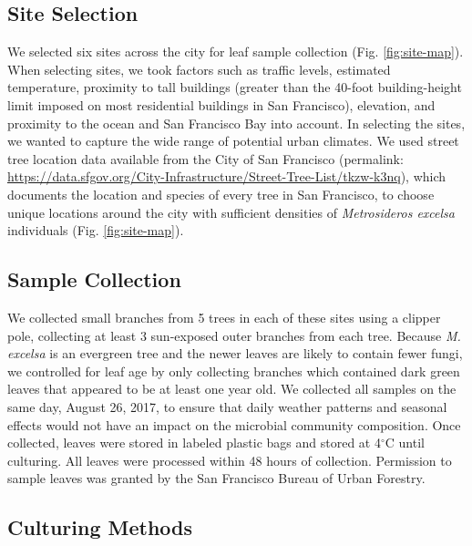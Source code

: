 \documentclass[fleqn,10pt,lineno]{wlpeerj} %
\begin{document}
\hypertarget{site-selection}{%
\subsection*{Site Selection}\label{site-selection}}

We selected six sites across the city for leaf sample collection (Fig. \ref{fig:site-map}). When selecting sites, we took factors such as traffic levels, estimated temperature, proximity to tall buildings (greater than the 40-foot building-height limit imposed on most residential buildings in San Francisco), elevation, and proximity to the ocean and San Francisco Bay into account. In selecting the sites, we wanted to capture the wide range of potential urban climates. We used street tree location data available from the City of San Francisco (permalink: \url{https://data.sfgov.org/City-Infrastructure/Street-Tree-List/tkzw-k3nq}), which documents the location and species of every tree in San Francisco, to choose unique locations around the city with sufficient densities of \emph{Metrosideros excelsa} individuals (Fig. \ref{fig:site-map}).

\hypertarget{sample-collection}{%
\subsection*{Sample Collection}\label{sample-collection}}

We collected small branches from 5 trees in each of these sites using a clipper pole, collecting at least 3 sun-exposed outer branches from each tree. Because \emph{M. excelsa} is an evergreen tree and the newer leaves are likely to contain fewer fungi, we controlled for leaf age by only collecting branches which contained dark green leaves that appeared to be at least one year old. We collected all samples on the same day, August 26, 2017, to ensure that daily weather patterns and seasonal effects would not have an impact on the microbial community composition. Once collected, leaves were stored in labeled plastic bags and stored at 4\(^{\circ}\)C until culturing. All leaves were processed within 48 hours of collection. Permission to sample leaves was granted by the San Francisco Bureau of Urban Forestry.

\hypertarget{culturing-methods}{%
\subsection*{Culturing Methods}\label{culturing-methods}}
\end{document}
